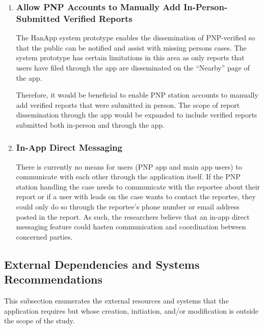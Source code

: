 \begin{enumerate}
    \item \subsubsection{Allow PNP Accounts to Manually Add In-Person-Submitted Verified Reports}
The HanApp system prototype enables the dissemination of PNP-verified so that the public can be notified and assist with missing persons cases. The system prototype has certain limitations in this area as only reports that users have filed through the app are disseminated on the “Nearby” page of the app.

Therefore, it would be beneficial to enable PNP station accounts to manually add verified reports that were submitted in person. The scope of report dissemination through the app would be expanded to include verified reports submitted both in-person and through the app.

    \item \subsubsection{In-App Direct Messaging}
There is currently no means for users (PNP app and main app users) to communicate with each other through the application itself. If the PNP station handling the case needs to communicate with the reportee about their report or if a user with leads on the case wants to contact the reportee, they could only do so through the reportee’s phone number or email address posted in the report. As such, the researchers believe that an in-app direct messaging feature could hasten communication and coordination between concerned parties.
\end{enumerate}

\subsection{External Dependencies and Systems Recommendations}

This subsection enumerates the external resources and systems that the application requires but whose creation, initiation, and/or modification is outside the scope of the study. 

